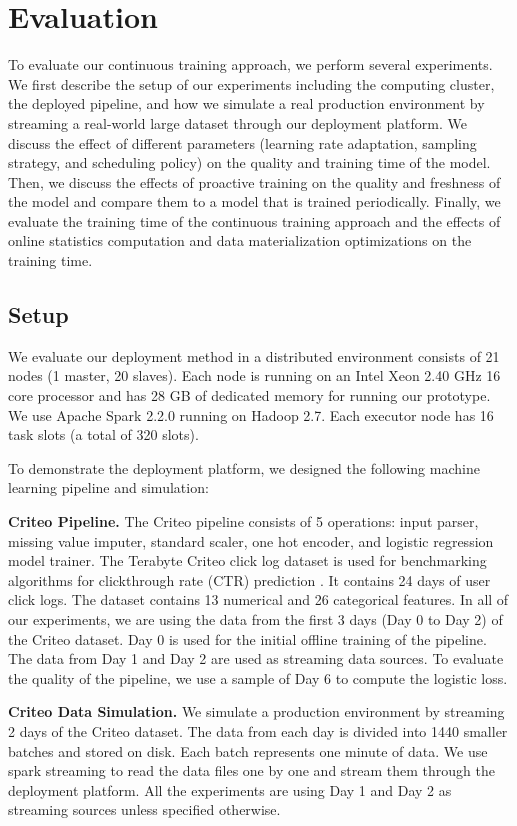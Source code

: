 \section{Evaluation} \label{evaluation} 
To evaluate our continuous training approach, we perform several experiments.
We first describe the setup of our experiments including the computing cluster, the deployed pipeline, and how we simulate a real production environment by streaming a real-world large dataset through our deployment platform.
We discuss the effect of different parameters (learning rate adaptation, sampling strategy, and scheduling policy) on the quality and training time of the model.
Then, we discuss the effects of proactive training on the quality and freshness of the model and compare them to a model that is trained periodically.
Finally, we evaluate the training time of the continuous training approach and the effects of online statistics computation and data materialization optimizations on the training time.

\subsection{Setup}\label{subsec:setup}
We evaluate our deployment method in a distributed environment consists of 21 nodes (1 master, 20 slaves).
Each node is running on an Intel Xeon 2.40 GHz 16 core processor and has 28 GB of dedicated memory for running our prototype.
We use Apache Spark 2.2.0 running on Hadoop 2.7.
Each executor node has 16 task slots (a total of 320 slots).

To demonstrate the deployment platform, we designed the following machine learning pipeline and simulation:

\textbf{Criteo Pipeline.} 
The Criteo pipeline consists of 5 operations: input parser, missing value imputer, standard scaler, one hot encoder, and logistic regression model trainer. 
The Terabyte Criteo click log dataset is used for benchmarking algorithms for clickthrough rate (CTR) prediction \cite{criteo-log}.
It contains 24 days of user click logs. 
The dataset contains 13 numerical and 26 categorical features. 
In all of our experiments, we are using the data from the first 3 days (Day 0 to Day 2) of the Criteo dataset.
Day 0 is used for the initial offline training of the pipeline.
The data from Day 1 and Day 2 are used as streaming data sources.
To evaluate the quality of the pipeline, we use a sample of Day 6 to compute the logistic loss.

\textbf{Criteo Data Simulation.}
We simulate a production environment by streaming 2 days of the Criteo dataset.
The data from each day is divided into 1440 smaller batches and stored on disk.
Each batch represents one minute of data.
We use spark streaming to read the data files one by one and stream them through the deployment platform. 
All the experiments are using Day 1 and Day 2 as streaming sources unless specified otherwise.

